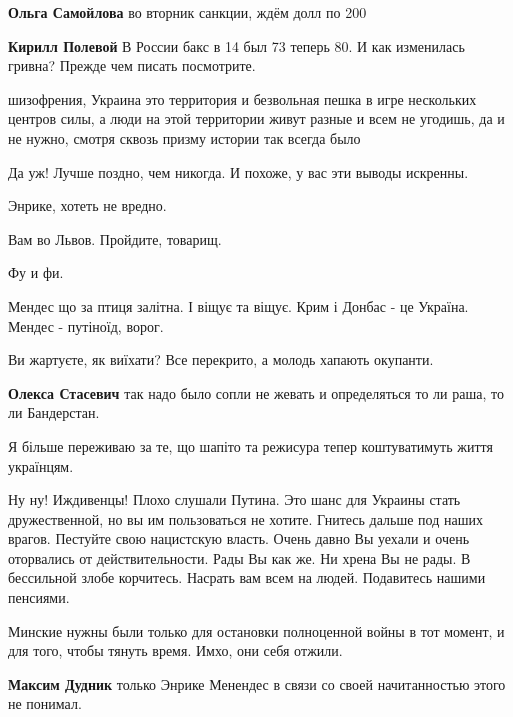 \begin{itemize}
\begin{itemize}
\textbf{Ольга Самойлова} во вторник санкции, ждём долл по 200

\textbf{Кирилл Полевой} В России бакс в 14 был 73 теперь 80. И как изменилась гривна? Прежде чем писать посмотрите.
\end{itemize} %


шизофрения, Украина это территория и безвольная пешка в игре нескольких центров
силы, а люди на этой территории живут разные и всем не угодишь, да и не нужно,
смотря сквозь призму истории так всегда было

Да уж! Лучше поздно, чем никогда. И похоже, у вас эти выводы искренны.

Энрике, хотеть не вредно.


Вам во Львов. Пройдите, товарищ.

Фу и фи.

Мендес що за птиця залітна. І віщує та віщує. Крим і Донбас - це Україна. Мендес - путіноїд, ворог.

Ви жартуєте, як виїхати? Все перекрито, а молодь хапають окупанти.

\textbf{Олекса Стасевич} так надо было сопли не жевать и определяться то ли раша, то ли Бандерстан.

Я більше переживаю за те, що шапіто та режисура тепер коштуватимуть життя українцям.


Ну ну! Иждивенцы! Плохо слушали Путина. Это шанс для Украины стать
дружественной, но вы им пользоваться не хотите. Гнитесь дальше под наших
врагов. Пестуйте свою нацистскую власть. Очень давно Вы уехали и очень оторвались
от действительности. Рады Вы как же. Ни хрена Вы не рады. В бессильной злобе
корчитесь. Насрать вам всем на людей. Подавитесь нашими пенсиями.


Минские нужны были только для остановки полноценной войны в тот момент, и для
того, чтобы тянуть время. Имхо, они себя отжили.

\textbf{Максим Дудник} только Энрике Менендес в связи со своей начитанностью этого не понимал.



\end{itemize}
